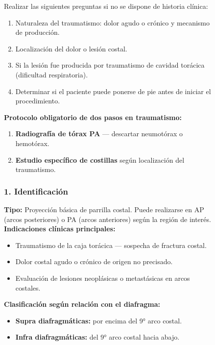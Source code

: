 \begin{figure}
{Realizar las siguientes preguntas si no se dispone de historia clínica:

\begin{enumerate}
  \item Naturaleza del traumatismo: dolor agudo o crónico y mecanismo de producción.
  \item Localización del dolor o lesión costal.
  \item Si la lesión fue producida por traumatismo de cavidad torácica (dificultad respiratoria).
  \item Determinar si el paciente puede ponerse de pie antes de iniciar el procedimiento.
\end{enumerate}

\textbf{Protocolo obligatorio de dos pasos en traumatismo:}
\begin{enumerate}
  \item \textbf{Radiografía de tórax PA} — descartar neumotórax o hemotórax.
  \item \textbf{Estudio específico de costillas} según localización del traumatismo.
\end{enumerate}

\subsubsection*{1. Identificación}

\textbf{Tipo:} Proyección básica de parrilla costal. Puede realizarse en AP (arcos posteriores) o PA (arcos anteriores) según la región de interés.\\

\textbf{Indicaciones clínicas principales:}

\begin{itemize}
  \item Traumatismo de la caja torácica — sospecha de fractura costal.
  \item Dolor costal agudo o crónico de origen no precisado.
  \item Evaluación de lesiones neoplásicas o metastásicas en arcos costales.
\end{itemize}

\textbf{Clasificación según relación con el diafragma:}

\begin{itemize}
  \item \textbf{Supra diafragmáticas:} por encima del 9° arco costal.
  \item \textbf{Infra diafragmáticas:} del 9° arco costal hacia abajo.
\end{itemize}

}
\end{figure}
